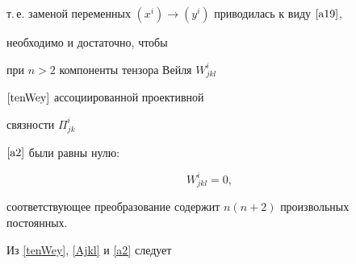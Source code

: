 т.\,е. заменой переменных $(x^i)\to (y^i)$ приводилась к виду $\eqref{a19}$,


необходимо и достаточно, чтобы


при $n>2$ компоненты тензора Вейля $W^i_{jkl}$


$\eqref{tenWey}$ ассоциированной проективной


связности $\Pi^i_{jk}$


$\eqref{a2}$ были равны нулю:


\begin{equation}\label{W=0}


W^i_{jkl}=0,


\end{equation}


соответствующее преобразование содержит $n(n+2)$ произвольных постоянных.





Из \eqref{tenWey}, \eqref{Ajkl} и \eqref{a2} следует





